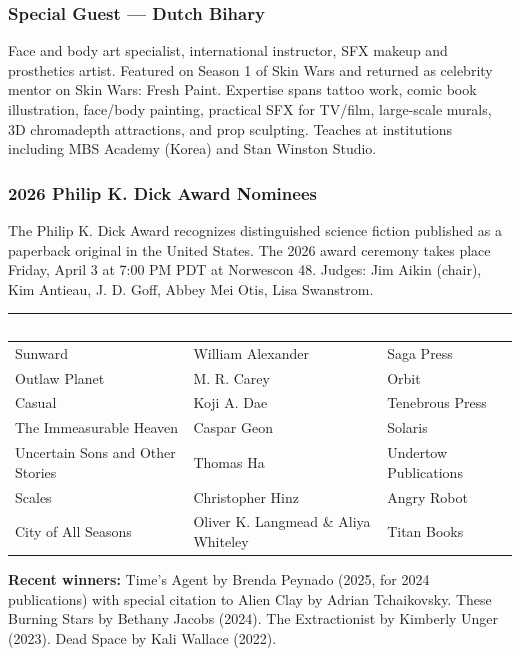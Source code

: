 \documentclass[11pt,letterpaper]{article}
\newcommand{\tableheader}[1]{\textbf{\sffamily\textcolor{white}{#1}}}
\begin{document}
\subsubsection{Special Guest --- Dutch Bihary}

Face and body art specialist, international instructor, SFX makeup and prosthetics artist. Featured on Season 1 of Skin Wars and returned as celebrity mentor on Skin Wars: Fresh Paint. Expertise spans tattoo work, comic book illustration, face/body painting, practical SFX for TV/film, large-scale murals, 3D chromadepth attractions, and prop sculpting. Teaches at institutions including MBS Academy (Korea) and Stan Winston Studio.

\subsubsection{2026 Philip K. Dick Award Nominees}

The Philip K. Dick Award recognizes distinguished science fiction published as a paperback original in the United States. The 2026 award ceremony takes place Friday, April 3 at 7:00 PM PDT at Norwescon 48. Judges: Jim Aikin (chair), Kim Antieau, J. D. Goff, Abbey Mei Otis, Lisa Swanstrom.

\begin{center}
\begin{tabularx}{\textwidth}{L{4.5cm}L{3.5cm}X}
\toprule
{}
\tableheader{Title} & \tableheader{Author} & \tableheader{Publisher} \\
\midrule
Sunward & William Alexander & Saga Press \\
Outlaw Planet & M. R. Carey & Orbit \\
Casual & Koji A. Dae & Tenebrous Press \\
The Immeasurable Heaven & Caspar Geon & Solaris \\
Uncertain Sons and Other Stories & Thomas Ha & Undertow Publications \\
Scales & Christopher Hinz & Angry Robot \\
City of All Seasons & Oliver K. Langmead \& Aliya Whiteley & Titan Books \\
\bottomrule
\end{tabularx}
\end{center}

\textbf{Recent winners:} Time's Agent by Brenda Peynado (2025, for 2024 publications) with special citation to Alien Clay by Adrian Tchaikovsky. These Burning Stars by Bethany Jacobs (2024). The Extractionist by Kimberly Unger (2023). Dead Space by Kali Wallace (2022).
\end{document}
